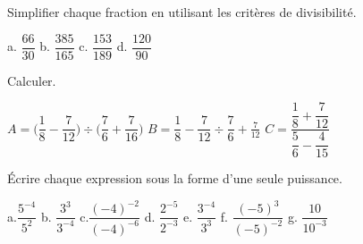 \documentclass[a4paper]{book}
\begin{document}
    \begin{exercice}
        Simplifier chaque fraction en utilisant les critères de divisibilité.

        \medskip

        a. $\dfrac{66}{30}$ \quad b. $\dfrac{385}{165}$ \quad c. $\dfrac{153}{189}$ \quad d. $\dfrac{120}{90}$
    \end{exercice}


    \begin{exercice}
        Calculer.

        $A=\bigg(\dfrac{1}{8}-\dfrac{7}{12}\bigg)\div\bigg(\dfrac{7}{6}+\dfrac{7}{16}\bigg)$
        \quad 
        $B=\dfrac{1}{8}-\dfrac{7}{12}\div\dfrac{7}{6}+\frac{7}{12}$
        \quad
        $C=\dfrac{\dfrac{1}{8}+\dfrac{7}{12}}{\dfrac{5}{6}-\dfrac{4}{15}}$
    \end{exercice}


    \begin{exercice}
        Écrire chaque expression sous la forme d'une seule puissance.

        \medskip
        
        a.$\dfrac{5^{-4}}{5^2}$ \quad b. $\dfrac{3^3}{3^{-4}}$ \quad c.$\dfrac{(-4)^{-2}}{(-4)^{-6}}$ \quad d. $\dfrac{2^{-5}}{2^{-3}}$ \quad e. $\dfrac{3^{-4}}{3^3}$ \quad f. $\dfrac{(-5)^{3}}{(-5)^{-2}}$ \quad g. $\dfrac{10}{10^{-3}}$
    \end{exercice}
\end{document}
